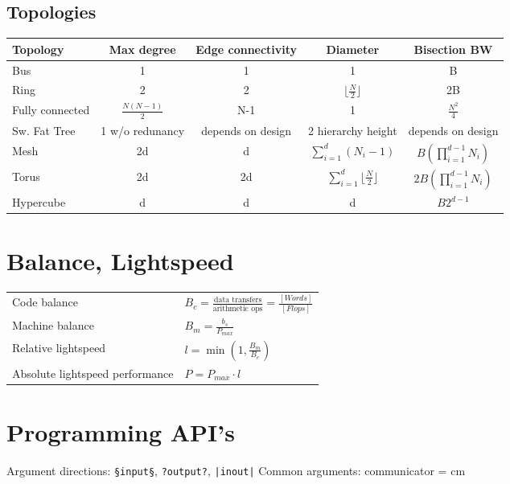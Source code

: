 \documentclass[11pt]{article}
\begin{document}
\subsection{Topologies}

\begin{tabular}{l | c c c c }
	\textbf{Topology} & \textbf{Max degree} & \textbf{Edge connectivity} & \textbf{Diameter} & \textbf{Bisection BW} \\
	\hline
	Bus		& 1  & 1   & 1 & B \\
	Ring		& 2  & 2   & \( \lfloor \frac{N}{2} \rfloor \) & 2B \\
	Fully connected	& \( \frac{N(N-1)}{2} \) & N-1 & 1 & \( \frac{N^2}{4} \) \\ 
	Sw. Fat Tree	& 1 w/o redunancy & depends on design & 2 hierarchy height & depends on design \\
	Mesh		& 2d & d   & \( \sum_{i=1}^d (N_i - 1) \) & \( B ( \prod_{i=1}^{d-1} N_i ) \) \\
	Torus		& 2d & 2d  & \( \sum_{i=1}^d \lfloor \frac{N}{2} \rfloor  \) & \( 2B ( \prod_{i=1}^{d-1} N_i ) \) \\

	Hypercube	& d  & d   & d & \( B2^{d-1} \) \\ 
\end{tabular}

\section{Balance, Lightspeed}

\begin{tabular}{ p{7cm} l }
	Code balance &  \( B_c = \frac{\text{data transfers}}{\text{arithmetic ops}} = \frac{[Words]}{[Flops]} \) \\
	Machine balance & \( B_m = \frac{b_s}{P_{max}} \) \\
	Relative lightspeed & \( l = \min(1, \frac{B_m}{B_c} ) \) \\
	Absolute lightspeed performance & \( P = P_{max} \cdot l \) \\
\end{tabular}

\section{Programming API's}

Argument directions: \lstinline$§input§$, \lstinline$?output?$, \lstinline$|inout|$
Common arguments:
	communicator = cm
\end{document}
